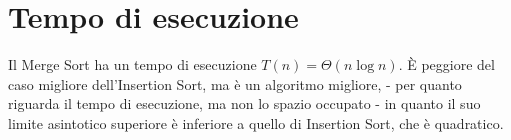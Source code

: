 \section{Tempo di esecuzione}
%
%
%	
%	
%	
%	
%	
%	
%
%
%
Il Merge Sort ha un tempo di esecuzione $T(n) = \Theta(n\log n)$. È peggiore del caso migliore dell'Insertion Sort, ma è un algoritmo migliore, - per quanto riguarda il tempo di esecuzione, ma non lo spazio occupato - in quanto il suo limite asintotico superiore è inferiore a quello di Insertion Sort, che è quadratico.

